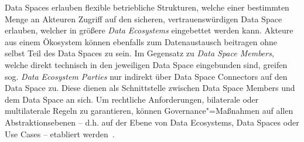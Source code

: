 Data Spaces erlauben flexible betriebliche Strukturen, welche einer bestimmten Menge an Akteuren Zugriff auf den sicheren, vertrauenswürdigen Data Space erlauben, welcher in größere \emph{Data Ecosystems} eingebettet werden kann.
Akteure aus einem Ökosystem können ebenfalls zum Datenaustausch beitragen ohne selbst Teil des Data Spaces zu sein.
Im Gegensatz zu \emph{Data Space Members}, welche direkt technisch in den jeweiligen Data Space eingebunden sind, greifen sog. \emph{Data Ecosystem Parties} nur indirekt über Data Space Connectors auf den Data Space zu. %
Diese dienen als Schnittstelle zwischen Data Space Members und dem Data Space an sich.
Um rechtliche Anforderungen, bilaterale oder multilaterale Regeln zu garantieren, können Governance"=Maßnahmen auf allen Abstraktionsebenen -- d.h. auf der Ebene von Data Ecosystems, Data Spaces oder Use Cases -- etabliert werden~\cite{mollerIndustrialDataEcosystems2024}.

